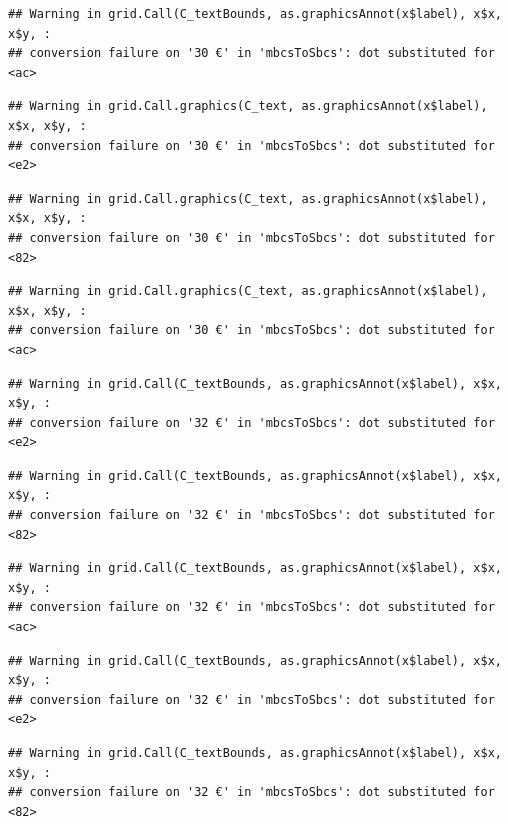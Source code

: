 \documentclass[
]{article}
\begin{document}
\begin{verbatim}
## Warning in grid.Call(C_textBounds, as.graphicsAnnot(x$label), x$x, x$y, :
## conversion failure on '30 €' in 'mbcsToSbcs': dot substituted for <ac>
\end{verbatim}

\begin{verbatim}
## Warning in grid.Call.graphics(C_text, as.graphicsAnnot(x$label), x$x, x$y, :
## conversion failure on '30 €' in 'mbcsToSbcs': dot substituted for <e2>
\end{verbatim}

\begin{verbatim}
## Warning in grid.Call.graphics(C_text, as.graphicsAnnot(x$label), x$x, x$y, :
## conversion failure on '30 €' in 'mbcsToSbcs': dot substituted for <82>
\end{verbatim}

\begin{verbatim}
## Warning in grid.Call.graphics(C_text, as.graphicsAnnot(x$label), x$x, x$y, :
## conversion failure on '30 €' in 'mbcsToSbcs': dot substituted for <ac>
\end{verbatim}

\begin{verbatim}
## Warning in grid.Call(C_textBounds, as.graphicsAnnot(x$label), x$x, x$y, :
## conversion failure on '32 €' in 'mbcsToSbcs': dot substituted for <e2>
\end{verbatim}

\begin{verbatim}
## Warning in grid.Call(C_textBounds, as.graphicsAnnot(x$label), x$x, x$y, :
## conversion failure on '32 €' in 'mbcsToSbcs': dot substituted for <82>
\end{verbatim}

\begin{verbatim}
## Warning in grid.Call(C_textBounds, as.graphicsAnnot(x$label), x$x, x$y, :
## conversion failure on '32 €' in 'mbcsToSbcs': dot substituted for <ac>
\end{verbatim}

\begin{verbatim}
## Warning in grid.Call(C_textBounds, as.graphicsAnnot(x$label), x$x, x$y, :
## conversion failure on '32 €' in 'mbcsToSbcs': dot substituted for <e2>
\end{verbatim}

\begin{verbatim}
## Warning in grid.Call(C_textBounds, as.graphicsAnnot(x$label), x$x, x$y, :
## conversion failure on '32 €' in 'mbcsToSbcs': dot substituted for <82>
\end{verbatim}
\end{document}
